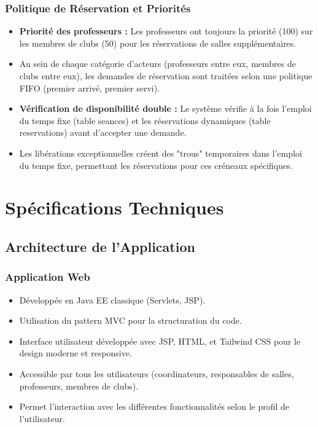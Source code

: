 \documentclass[12pt,a4paper]{article}
\begin{document}
\subsubsection{Politique de Réservation et Priorités}
\begin{itemize}
    \item \textbf{Priorité des professeurs :} Les professeurs ont toujours la priorité (100) sur les membres de clubs (50) pour les réservations de salles supplémentaires.
    \item Au sein de chaque catégorie d'acteurs (professeurs entre eux, membres de clubs entre eux), les demandes de réservation sont traitées selon une politique FIFO (premier arrivé, premier servi).
    \item \textbf{Vérification de disponibilité double :} Le système vérifie à la fois l'emploi du temps fixe (table seances) et les réservations dynamiques (table reservations) avant d'accepter une demande.
    \item Les libérations exceptionnelles créent des "trous" temporaires dans l'emploi du temps fixe, permettant les réservations pour ces créneaux spécifiques.
\end{itemize}

\section{Spécifications Techniques}

\subsection{Architecture de l'Application}

\subsubsection{Application Web}
\begin{itemize}
    \item Développée en Java EE classique (Servlets, JSP).
    \item Utilisation du pattern MVC pour la structuration du code.
    \item Interface utilisateur développée avec JSP, HTML, et Tailwind CSS pour le design moderne et responsive.
    \item Accessible par tous les utilisateurs (coordinateurs, responsables de salles, professeurs, membres de clubs).
    \item Permet l'interaction avec les différentes fonctionnalités selon le profil de l'utilisateur.
\end{itemize}
\end{document}
